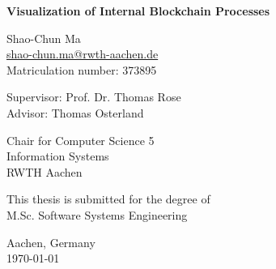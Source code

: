 \begin{titlepage}
    \begin{center}
        \vspace*{1cm}
        
        \huge
        \textbf{Visualization of Internal Blockchain Processes}
        
        \vspace{2cm}
        
        \large
        Shao-Chun Ma \\
        \href{mailto:shao-chun.ma@rwth-aachen.de}{shao-chun.ma@rwth-aachen.de} \\
        Matriculation number: 373895

        \vspace{1cm}

        Supervisor: Prof. Dr. Thomas Rose \\
        Advisor: Thomas Osterland \\

        \vspace{1.5cm}

        Chair for Computer Science 5 \\
        Information Systems \\
        RWTH Aachen
        
        \vfill
        
        This thesis is submitted for the degree of \\
        M.Sc. Software Systems Engineering
        
        \vspace{3cm}
        
        Aachen, Germany \\
        \today
        
    \end{center}
\end{titlepage}